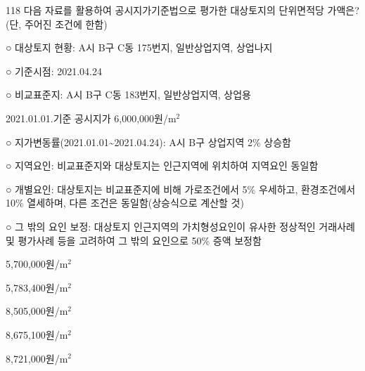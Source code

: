 \begin{question}{118}
다음 자료를 활용하여 공시지가기준법으로 평가한 대상토지의 단위면적당 가액은? (단, 주어진 조건에 한함)
\begin{framedtext}
○ 대상토지 현황: A시 B구 C동 175번지, 일반상업지역, 상업나지 \par
○ 기준시점: 2021.04.24 \par
○ 비교표준지: A시 B구 C동 183번지, 일반상업지역, 상업용 \par
\hspace*{4em}2021.01.01.기준 공시지가 6,000,000원/m$^2$ \par
○ 지가변동률(2021.01.01\textasciitilde 2021.04.24): A시 B구 상업지역 2\% 상승함 \par
○ 지역요인: 비교표준지와 대상토지는 인근지역에 위치하여 지역요인 동일함 \par
○ 개별요인: 대상토지는 비교표준지에 비해 가로조건에서 5\% 우세하고, 환경조건에서 10\% 열세하며, 다른 조건은 동일함(상승식으로 계산할 것) \par
○ 그 밖의 요인 보정: 대상토지 인근지역의 가치형성요인이 유사한 정상적인 거래사례 및 평가사례 등을 고려하여 그 밖의 요인으로 50\% 증액 보정함 \par
\end{framedtext}
\begin{choices}
  \item 5,700,000원/m$^2$
  \item 5,783,400원/m$^2$
  \item 8,505,000원/m$^2$
  \item 8,675,100원/m$^2$
  \item 8,721,000원/m$^2$
\end{choices}
\end{question}
